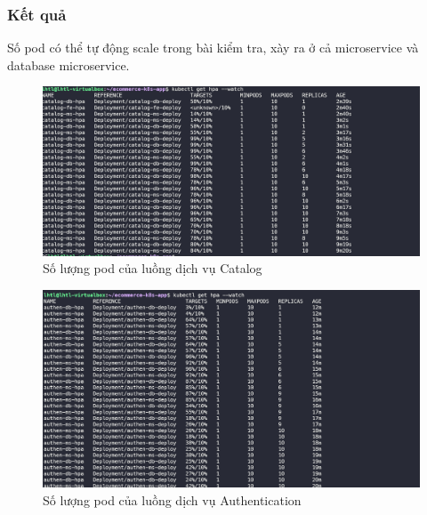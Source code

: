 \subsubsection{Kết quả}
\noindent Số pod có thể tự động scale trong bài kiểm tra, xày ra ở cả microservice và database microservice.

\begin{figure}[H]
  \begin{center}
      \includegraphics[scale = 0.65]{images/hanh/fullflow-test/full-flow-catalog-with-hpa-show-hpa}
      \vspace*{1mm}
  \end{center}
  \caption{Số lượng pod của luồng dịch vụ Catalog}
  \label{}

\end{figure}

\begin{figure}[H]
  \begin{center}
      \includegraphics[scale = 0.65]{images/hanh/fullflow-test/full-flow-authen-with-hpa-show-hpa}
      \vspace*{1mm}
  \end{center}
  \caption{Số lượng pod của luồng dịch vụ Authentication}
  \label{}

\end{figure}

